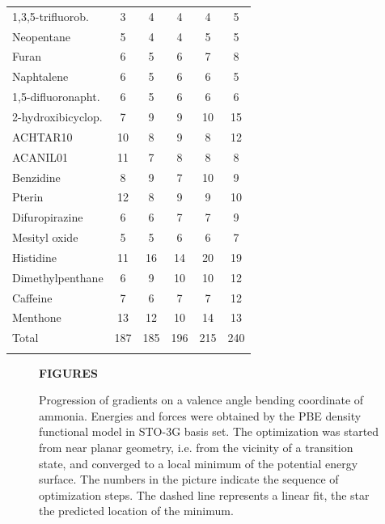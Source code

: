 \documentclass[prl,aps,preprint,showpacs,superbib]{revtex4}
\begin{document}
{\begin{table}[h]
\begin{tabular}{lccccc}
1,3,5-trifluorob.      &   3    &   4    &    4    &    4   &   5     \\
Neopentane             &   5    &   4    &    4    &    5   &   5     \\
Furan                  &   6    &   5    &    6    &    7   &   8     \\
Naphtalene             &   6    &   5    &    6    &    6   &   5     \\
1,5-difluoronapht.     &   6    &   5    &    6    &    6   &   6     \\
2-hydroxibicyclop.     &   7    &   9    &    9    &   10   &  15     \\
ACHTAR10               &  10    &   8    &    9    &    8   &  12     \\
ACANIL01               &  11    &   7    &    8    &    8   &   8     \\
Benzidine              &   8    &   9    &    7    &   10   &   9     \\
Pterin                 &  12    &   8    &    9    &    9   &  10     \\
Difuropirazine         &   6    &   6    &    7    &    7   &   9     \\
Mesityl oxide          &   5    &   5    &    6    &    6   &   7     \\
Histidine              &  11    &  16    &   14    &   20   &  19     \\
Dimethylpenthane       &   6    &   9    &   10    &   10   &  12     \\
Caffeine               &   7    &   6    &    7    &    7   &  12     \\
Menthone               &  13    &  12    &   10    &   14   &  13     \\
\colrule
Total                  & 187    & 185    &  196    &  215   & 240     \\
\botrule
\end{tabular}
\end{table}


\clearpage

\begin{figure}[h]
\begin{center}
\bf  FIGURES\\[1.cm]
\end{center}

\caption{
Progression of gradients on a valence angle bending coordinate of
ammonia. Energies and forces were obtained by the PBE 
density functional model in STO-3G basis set.
The optimization was started from near planar geometry, i.e.
from the vicinity of a transition state, and converged to a local 
minimum of the potential energy surface. The numbers in the picture
indicate the sequence of optimization steps. The dashed line represents
a linear fit, the star the predicted location of the minimum.}\label{NH3outp6}



\end{figure}}
\end{document}
